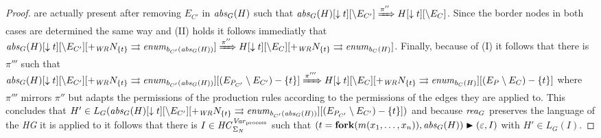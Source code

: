 \begin{proof}
		are actually present after removing $E_{C'}$ in $\mathit{abs}_{G}(H)$ such that
		$\mathit{abs}_{G}(H)[\downarrow t][\setminus E_{C'}]\xRightarrow{\pi''}
		H[\downarrow t][\setminus E_{C}]$. Since the border nodes in both cases
		are determined the same way and (II) holds it follows immediatly that
		$\mathit{abs}_{G}(H)[\downarrow t][\setminus E_{C'}]
		[+_{\mathit{WR}}N_{\{t\}}\rightrightarrows
		\mathit{enum}_{b_{C'}(\mathit{abs}_{G}(H))}]\xRightarrow{\pi''}
		H[\downarrow t][\setminus E_{C}][+_{\mathit{WR}}N_{\{t\}}
		\rightrightarrows\mathit{enum}_{b_{C}(H)}]$. Finally, because of (I) it follows
		that there is $\pi'''$ such that
		$\mathit{abs}_{G}(H)[\downarrow t]
		[\setminus E_{C'}][+_\mathit{WR}N_{\{t\}}
		\rightrightarrows \mathit{enum}_{b_{C'}(\mathit{abs}_{G}(H))}]
		[(E_{P_{C'}}\setminus E_{C'}) - \{t\}]
		\xRightarrow{\pi'''}H[\downarrow t][\setminus E_{C}]
		[+_{\mathit{WR}}N_{\{t\}}\rightrightarrows
		\mathit{enum}_{b_{C}(H)}][(E_{P}\setminus E_{C})-\{t\}]$ where $\pi'''$ mirrors
		$\pi''$ but adapts the permissions of the production rules according to
		the permissions of the edges they are applied to. This concludes that
		$H'\in L_{G}(\mathit{abs}_{G}(H)[\downarrow t]
		[\setminus E_{C'}][+_\mathit{WR}N_{\{t\}}
		\rightrightarrows \mathit{enum}_{b_{C'}(\mathit{abs}_{G}(H))}]
		[(E_{P_{C'}}\setminus E_{C'}) - \{t\}])$ and because $\mathit{rea}_{G}$ preserves
		the language of the \emph{\ac{HG}} it is applied to it follows that there
		is $I\in\mathit{HC}_{\Sigma_{N}}^{\mathit{Var}_{\text{process}}}$ such that $(t=\text{\textbf{fork}}(m(x_1,\dots,x_n)),
		\mathit{abs}_{G}(H))\blacktriangleright(\varepsilon, I)$ with $H'\in L_{G}(I)$.
	\end{proof}

